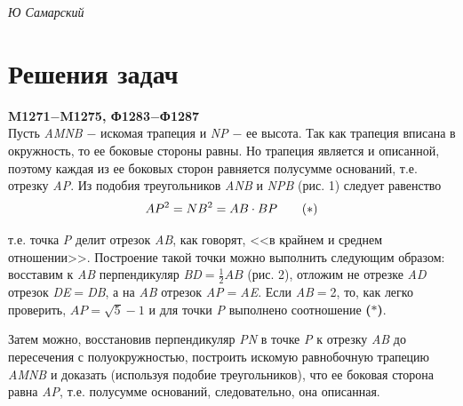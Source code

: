 \begin{minipage}{0.75\textwidth}
     \hspace*{\fill} \textit{Ю Самарский}
    
    \section*{\textbf{Решения задач}}
    \textbf{M1271$-$M1275, Ф1283$-$Ф1287}
    \vspace{6pt} \\
    Пусть \textit{AMNB} $-$ искомая трапеция и \textit{NP} $-$ ее высота.
    Так как трапеция вписана в окружность, то ее боковые стороны равны. Но трапеция является и описанной, поэтому каждая из ее боковых сторон равняется полусумме оснований, т.е. отрезку \textit{AP}. Из подобия треугольников \textit{ANB} и \textit{NPB} (рис. 1) следует равенство 
    \begin{equation*}
    AP^2=NB^2=AB\cdot BP
    \tag{\textbf{$*$}}
    \end{equation*}
        
    т.е. точка \textit{P} делит отрезок \textit{AB}, как говорят, <<в крайнем и среднем отношении>>. Построение такой точки можно выполнить следующим образом: восставим к \textit{AB} перпендикуляр \textit{BD}$=\frac{1}{2}AB$ (рис. 2), отложим не отрезке \textit{AD} отрезок \textit{DE$=$DB}, а на \textit{AB} отрезок \textit{AP$=$AE}. Если \textit{AB$=$}2, то, как легко проверить, $AP=\sqrt{5}-1$ и для точки \textit{P} выполнено соотношение \textbf{($*$)}. \par
    \hspace{10pt} Затем можно, восстановив перпендикуляр \textit{PN} в точке \textit{P} к отрезку \textit{AB} до пересечения с полуокружностью, построить искомую равнобочную трапецию \textit{AMNB} и доказать (используя подобие треугольников), что ее боковая сторона равна \textit{AP}, т.е. полусумме оснований, следовательно, она описанная.
    
    
    \end{minipage}
    
    \newpage
    
